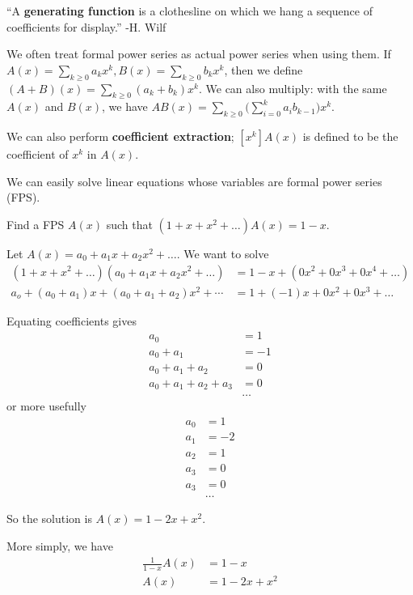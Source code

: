 \documentclass[12pt]{article}
\begin{document}
``A {\bf generating function} is a clothesline on which we hang a sequence of coefficients for display.'' -H. Wilf

We often treat formal power series as actual power series when using them. If $A(x) = \displaystyle\sum_{k\geq 0} a_k x^k, B(x) = \sum_{k\geq 0} b_k x^k$, then we define $(A+B)(x) = \displaystyle\sum_{k\geq 0} (a_k + b_k) x^k$. We can also multiply: with the same $A(x)$ and $B(x)$, we have $AB(x) = \displaystyle\sum_{k\geq 0} \bigg(\sum_{i=0}^k a_i b_{k-1}\bigg) x^k$.

We can also perform {\bf coefficient extraction}; $[x^k]A(x)$ is defined to be the coefficient of $x^k$ in $A(x)$.

We can easily solve linear equations whose variables are formal power series (FPS).

\begin{example}
Find a FPS $A(x)$ such that $(1 + x + x^2 + \dots)A(x) = 1-x$.

Let $A(x) = a_0 + a_1 x + a_2 x^2 + \dots$. We want to solve
\begin{align*}
(1 + x + x^2 + \dots)(a_0 + a_1 x + a_2 x^2 + \dots) &= 1 - x + (0x^2 + 0x^3 + 0x^4 + \dots)\\
a_o + (a_0 + a_1)x + (a_0 + a_1 + a_2)x^2 + \cdots &= 1 + (-1)x + 0x^2 + 0x^3 + \dots
\end{align*}

Equating coefficients gives
\begin{align*}
a_0 &= 1\\
a_0 + a_1 &= -1\\
a_0 + a_1 + a_2 &= 0\\
a_0 + a_1 + a_2 + a_3 &= 0\\
&\dots
\end{align*}
or more usefully
\begin{align*}
a_0 &= 1\\
a_1 &= -2\\
a_2 &= 1\\
a_3 &= 0\\
a_3 &= 0\\
&\dots
\end{align*}

So the solution is $A(x) = 1 - 2x + x^2$.

More simply, we have
\begin{align*}
\frac{1}{1-x} A(x) &= 1 - x\\
A(x) &= 1 -2x + x^2
\end{align*}
\end{example}
\end{document}
